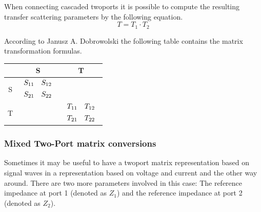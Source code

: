 When connecting cascaded twoports it is possible to compute the
resulting transfer scattering parameters by the following equation.
\begin{equation}
T = T_1 \cdot T_2
\end{equation}

According to Janusz A. Dobrowolski \cite{Dobrowolski} the following
table contains the matrix transformation formulas.

\addvspace{12pt}

\begin{tabular}{|c|c|c|}
\hline
& S & T\\
\hline
S &
$\begin{array}{cc}S_{11}&S_{12}\vspace{4pt}\\S_{21}&S_{22}\end{array}$ &
\setlength{\fboxrule}{0pt}
\fbox{$\begin{array}{cc}\dfrac{T_{12}}{T_{22}}&\dfrac{\Delta T}{T_{22}}\vspace{4pt}\\\dfrac{1}{T_{22}}&\dfrac{-T_{21}}{T_{22}}\end{array}$}\\
\hline
T &
\setlength{\fboxrule}{0pt}
\fbox{$\begin{array}{cc}\dfrac{-\Delta S}{S_{21}}&\dfrac{S_{11}}{S_{21}}\vspace{4pt}\\\dfrac{-S_{22}}{S_{21}}&\dfrac{1}{S_{21}}\end{array}$} &
$\begin{array}{cc}T_{11}&T_{12}\vspace{4pt}\\T_{21}&T_{22}\end{array}$\\
\hline
\end{tabular}

\subsubsection{Mixed Two-Port matrix conversions}

Sometimes it may be useful to have a twoport matrix representation
based on signal waves in a representation based on voltage and current
and the other way around.  There are two more parameters involved in
this case: The reference impedance at port 1 (denoted as $Z_1$) and
the reference impedance at port 2 (denoted as $Z_2$).

